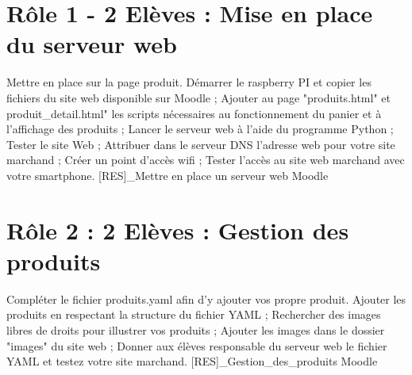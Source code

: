 \documentclass[11pt]{article}
\begin{document}
\UPSTIbuildPage




\section*{Rôle 1 - 2 Elèves : Mise en place du serveur web}

\activiteressources
{Mettre en place sur la page produit.}
{
\task Démarrer le raspberry PI et copier les fichiers du site web disponible sur Moodle ;
\task Ajouter au page "produits.html" et produit_detail.html" les scripts nécessaires au fonctionnement du panier et à l'affichage des produits ;
\task Lancer le serveur web à l'aide du programme Python ;
\task Tester le site Web ;
\task Attribuer dans le serveur DNS l'adresse web pour votre site marchand ;
\task Créer un point d'accès wifi ;
\task Tester l'accès au site web marchand avec votre smartphone.
}
{[RES]_Mettre en place un serveur web}
{Moodle}

\section*{Rôle 2 : 2 Elèves : Gestion des produits}

\activiteressources
{Compléter le fichier produits.yaml afin d'y ajouter vos propre produit.}
{
\task Ajouter les produits en respectant la structure du fichier YAML ;
\task Rechercher des images libres de droits pour illustrer vos produits ;
\task Ajouter les images dans le dossier "images" du site web ;
\task Donner aux élèves responsable du serveur web le fichier YAML et testez votre site marchand.
}
{[RES]_Gestion_des_produits}
{Moodle}
\end{document}
